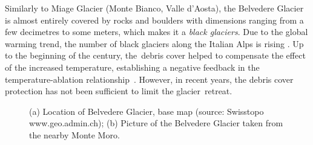 Similarly to Miage Glacier (Monte Bianco, Valle d’Aosta), the Belvedere Glacier is almost entirely covered by rocks and boulders with dimensions ranging from a few decimetres to
some meters, which makes it a \textit{black glaciers}.
Due to the global warming trend, the number of black glaciers along the Italian Alps is
rising \citep{Diolaiuti2003}.
Up to the beginning of the century, the~debris cover helped to compensate the effect of
the increased temperature, establishing a negative feedback in the temperature-ablation
relationship~\citep{Roethlisberger1985,Diolaiuti2003}.
However, in recent years, the debris cover protection has not been sufficient to limit
the glacier~retreat.

\begin{figure}
    \centering
    \caption{(a) Location of Belvedere Glacier, base map (source: Swisstopo
        www.geo.admin.ch); (b) Picture of the Belvedere Glacier taken from the nearby Monte Moro.}
    \label{fig:1:studyarea}
\end{figure}

